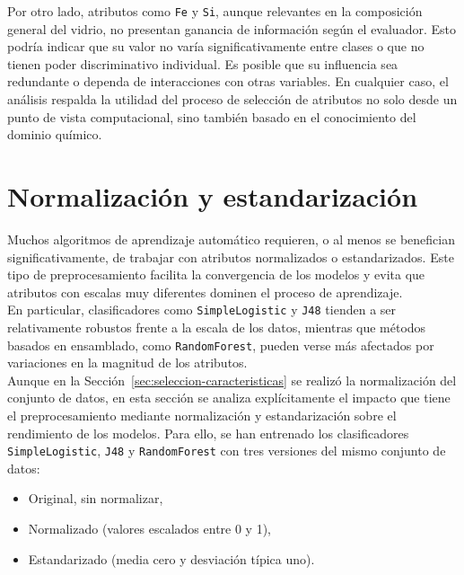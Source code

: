 \documentclass{article}
\begin{document}
Por otro lado, atributos como \texttt{Fe} y \texttt{Si}, aunque relevantes en la composición general del vidrio, no presentan ganancia de información según el evaluador. Esto podría indicar que su valor no varía significativamente entre clases o que no tienen poder discriminativo individual. Es posible que su influencia sea redundante o dependa de interacciones con otras variables. En cualquier caso, el análisis respalda la utilidad del proceso de selección de atributos no solo desde un punto de vista computacional, sino también basado en el conocimiento del dominio químico.\\



\section{Normalización y estandarización}

Muchos algoritmos de aprendizaje automático requieren, o al menos se benefician significativamente, de trabajar con atributos normalizados o estandarizados. Este tipo de preprocesamiento facilita la convergencia de los modelos y evita que atributos con escalas muy diferentes dominen el proceso de aprendizaje.\\

En particular, clasificadores como \texttt{SimpleLogistic} y \texttt{J48} tienden a ser relativamente robustos frente a la escala de los datos, mientras que métodos basados en ensamblado, como \texttt{RandomForest}, pueden verse más afectados por variaciones en la magnitud de los atributos.\\

Aunque en la Sección~\ref{sec:seleccion-caracteristicas} se realizó la normalización del conjunto de datos, en esta sección se analiza explícitamente el impacto que tiene el preprocesamiento mediante normalización y estandarización sobre el rendimiento de los modelos. Para ello, se han entrenado los clasificadores \texttt{SimpleLogistic}, \texttt{J48} y \texttt{RandomForest} con tres versiones del mismo conjunto de datos:\\

\begin{itemize}
    \item Original, sin normalizar,
    \item Normalizado (valores escalados entre 0 y 1),
    \item Estandarizado (media cero y desviación típica uno).
\end{itemize}
\end{document}

